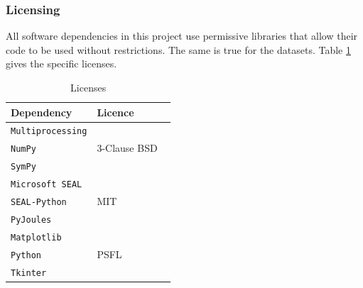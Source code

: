 \subsubsection{Licensing}
\setlength{\leftskip}{0.5cm}
\indent \indent
All software dependencies in this project use permissive libraries that allow their code to be used without restrictions. The same is true for the datasets. Table \ref{tab:licensing} gives the specific licenses.
\begin{table}[h!]
\centering
\def\arraystretch{1}
\begin{tabular}{|p{5cm}|p{4cm}|}
    \hline
    \textrm{\textbf{Dependency}} & \textrm{\textbf{Licence}} \\
    \hline \hline
    \texttt{Multiprocessing} & \multirow{3}{*}{\textrm{3-Clause BSD ~\cite{BSD}}} \\ 
    \texttt{NumPy} & \\ 
    \texttt{SymPy} & \\
    \hline
    \texttt{Microsoft SEAL} & \multirow{3}{*}{\textrm{MIT ~\cite{MIT}}} \\
    \texttt{SEAL-Python} & \\
    \texttt{PyJoules} & \\
    \hline
    \texttt{Matplotlib} & \multirow{3}{*}{\textrm{PSFL ~\cite{PSFL}}} \\ 
    \texttt{Python} & \\
    \texttt{Tkinter} & \\
    \hline
\end{tabular}
\caption{Licenses}
\label{tab:licensing}
\end{table}

\setlength{\leftskip}{0cm}

